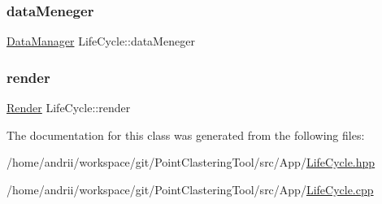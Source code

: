 \mbox{\label{classLifeCycle_adf58bd8151300e569f09b4c64e63c168}} 
\subsubsection{\texorpdfstring{data\+Meneger}{dataMeneger}}
{\footnotesize\ttfamily \mbox{\hyperlink{classDataManager}{Data\+Manager}} Life\+Cycle\+::data\+Meneger\hspace{0.3cm}{\ttfamily [private]}}

\mbox{\label{classLifeCycle_a3f1ac7946197d0212d2ddea213f16e31}} 
\subsubsection{\texorpdfstring{render}{render}}
{\footnotesize\ttfamily \mbox{\hyperlink{classRender}{Render}} Life\+Cycle\+::render\hspace{0.3cm}{\ttfamily [private]}}



The documentation for this class was generated from the following files\+:\begin{DoxyCompactItemize}
\item 
/home/andrii/workspace/git/\+Point\+Clastering\+Tool/src/\+App/\mbox{\hyperlink{LifeCycle_8hpp}{Life\+Cycle.\+hpp}}\item 
/home/andrii/workspace/git/\+Point\+Clastering\+Tool/src/\+App/\mbox{\hyperlink{LifeCycle_8cpp}{Life\+Cycle.\+cpp}}\end{DoxyCompactItemize}
